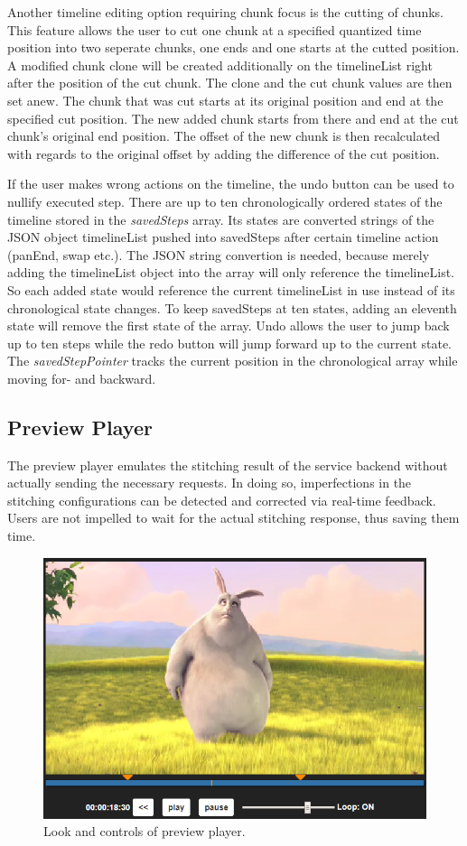 \documentclass[conference]{IEEEtran}
\begin{document}
Another timeline editing option requiring chunk focus is the cutting of chunks.
This feature allows the user to cut one chunk at a specified quantized time position into two seperate chunks, one ends and one starts at the cutted position.
A modified chunk clone will be created additionally on the timelineList right after the position of the cut chunk.
The clone and the cut chunk values are then set anew.
The chunk that was cut starts at its original position and end at the specified cut position.
The new added chunk starts from there and end at the cut chunk's original end position.
The offset of the new chunk is then recalculated with regards to the original offset by adding the difference of the cut position. 

If the user makes wrong actions on the timeline, the undo button can be used to nullify executed step.
There are up to ten chronologically ordered states of the timeline stored in the \textit{savedSteps} array.
Its states are converted strings of the JSON object timelineList pushed into savedSteps after certain timeline action (panEnd, swap etc.).
The JSON string convertion is needed, because merely adding the timelineList object into the array will only reference the timelineList.
So each added state would reference the current timelineList in use instead of its chronological state changes.
To keep savedSteps at ten states, adding an eleventh state will remove the first state of the array.
Undo allows the user to jump back up to ten steps while the redo button will jump forward up to the current state.
The \textit{savedStepPointer} tracks the current position in the chronological array while moving for- and backward.

\subsection{Preview Player}
The preview player emulates the stitching result of the service backend without actually sending the necessary requests.
In doing so, imperfections in the stitching configurations can be detected and corrected via real-time feedback.
Users are not impelled to wait for the actual stitching response, thus saving them time.
\begin{figure}[H]
\centering
\includegraphics[scale=0.5]{preview_player.png}
\caption{Look and controls of preview player.}
\end{figure}
\end{document}
